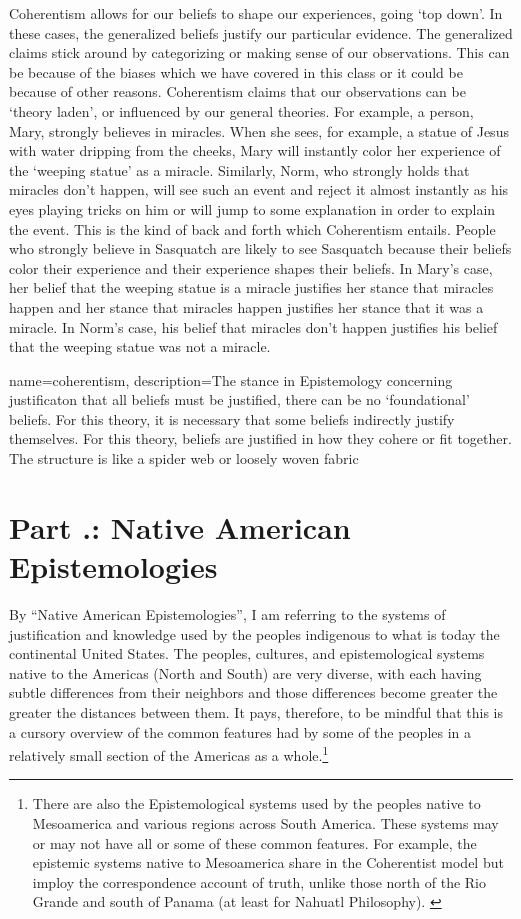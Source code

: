 Coherentism allows for our beliefs to shape our experiences, going `top down'. In these cases, the generalized beliefs justify our particular evidence. The generalized claims stick around by categorizing or making sense of our observations. This can be because of the biases which we have covered in this class or it could be because of other reasons. Coherentism claims that our observations can be `theory laden', or influenced by our general theories. For example, a person, Mary, strongly believes in miracles. When she sees, for example, a statue of Jesus with water dripping from the cheeks, Mary will instantly color her experience of the `weeping statue' as a miracle. Similarly, Norm, who strongly holds that miracles don't happen, will see such an event and reject it almost instantly as his eyes playing tricks on him or will jump to some explanation in order to explain the event. This is the kind of back and forth which Coherentism entails. People who strongly believe in Sasquatch are likely to see Sasquatch because their beliefs color their experience and their experience shapes their beliefs. In Mary's case, her belief that the weeping statue is a miracle justifies her stance that miracles happen and her stance that miracles happen justifies her stance that it was a miracle. In Norm's case, his belief that miracles don't happen justifies his belief that the weeping statue was not a miracle. 


{
name=coherentism,
description={The stance in Epistemology concerning justificaton that all beliefs must be justified, there can be no `foundational' beliefs. For this theory, it is necessary that some beliefs indirectly justify themselves. For this theory, beliefs are justified in how they cohere or fit together. The structure is like a spider web or loosely woven fabric}
}


\section{Part \thechapcount.\theseccount: Native American Epistemologies}

By ``Native American Epistemologies'', I am referring to the systems of justification and knowledge used by the peoples indigenous to what is today the continental United States. The peoples, cultures, and epistemological systems native to the Americas (North and South) are very diverse, with each having subtle differences from their neighbors and those differences become greater the greater the distances between them. It pays, therefore, to be mindful that this is a cursory overview of the common features had by some of the peoples in a relatively small section of the Americas as a whole.\footnote{There are also the Epistemological systems used by the peoples native to Mesoamerica and various regions across South America. These systems may or may not have all or some of these common features. For example, the epistemic systems native to Mesoamerica share in the Coherentist model but imploy the correspondence account of truth, unlike those north of the Rio Grande and south of Panama (at least for Nahuatl Philosophy). \autocite[p. 69]{McLeod1}}  


